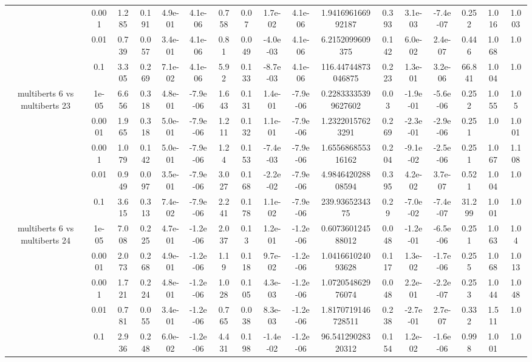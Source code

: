 \begin{tabular}{|c|c|c|c|c|c|c|c|c|c|c|c|c|c|c|c|c|}
 & 0.001 & 1.285 & 0.191 & 4.9e-01 & 4.1e-06 & 0.758 & 0.07 & 1.7e-02 & 4.1e-06 & 1.941696166992187 & 0.393 & 3.1e-03 & -7.4e-07 & 0.252 & 1.016 & 1.003 \\
 & 0.01 & 0.739 & 0.057 & 3.4e-01 & 4.1e-06 & 0.81 & 0.049 & -4.0e-03 & 4.1e-06 & 6.2152099609375 & 0.142 & 6.0e-02 & 2.4e-07 & 0.446 & 1.068 & 1.0 \\
 & 0.1 & 3.305 & 0.269 & 7.1e-02 & 4.1e-06 & 5.92 & 0.133 & -8.7e-03 & 4.1e-06 & 116.44744873046875 & 0.223 & 1.3e-01 & 3.2e-06 & 66.841 & 1.004 & 1.0 \\
\hline
\multirow{5}{*}{multiberts 6 vs multiberts 23} & 1e-05 & 6.656 & 0.318 & 4.8e-01 & -7.9e-06 & 1.643 & 0.131 & 1.4e-01 & -7.9e-06 & 0.22833335399627602 & 0.03 & -1.9e-01 & -5.6e-06 & 0.252 & 1.055 & 1.05 \\
 & 0.0001 & 1.965 & 0.318 & 5.0e-01 & -7.9e-06 & 1.211 & 0.132 & 1.1e-01 & -7.9e-06 & 1.23220157623291 & 0.269 & -2.3e-01 & -2.9e-06 & 0.251 & 1.0 & 1.001 \\
 & 0.001 & 1.079 & 0.142 & 5.0e-01 & -7.9e-06 & 1.24 & 0.153 & -7.4e-03 & -7.9e-06 & 1.655686855316162 & 0.204 & -9.1e-02 & -2.5e-06 & 0.251 & 1.067 & 1.108 \\
 & 0.01 & 0.949 & 0.097 & 3.5e-01 & -7.9e-06 & 3.027 & 0.168 & -2.2e-02 & -7.9e-06 & 4.984642028808594 & 0.395 & 4.2e-02 & 3.7e-07 & 0.521 & 1.004 & 1.0 \\
 & 0.1 & 3.615 & 0.313 & 7.4e-02 & -7.9e-06 & 2.241 & 0.178 & 1.1e-02 & -7.9e-06 & 239.9365234375 & 0.29 & -7.0e-02 & -7.4e-07 & 31.299 & 1.001 & 1.0 \\
\hline
\multirow{5}{*}{multiberts 6 vs multiberts 24} & 1e-05 & 7.008 & 0.225 & 4.7e-01 & -1.2e-06 & 2.037 & 0.13 & 1.2e-01 & -1.2e-06 & 0.607360124588012 & 0.048 & -1.2e-01 & -6.5e-06 & 0.251 & 1.063 & 1.04 \\
 & 0.0001 & 2.073 & 0.268 & 4.9e-01 & -1.2e-06 & 1.19 & 0.118 & 9.7e-02 & -1.2e-06 & 1.041661024093628 & 0.117 & 1.3e-02 & -1.7e-06 & 0.255 & 1.068 & 1.013 \\
 & 0.001 & 1.721 & 0.224 & 4.8e-01 & -1.2e-06 & 1.028 & 0.105 & 4.3e-03 & -1.2e-06 & 1.072054862976074 & 0.048 & 2.2e-01 & -2.2e-07 & 0.253 & 1.044 & 1.048 \\
 & 0.01 & 0.781 & 0.055 & 3.4e-01 & -1.2e-06 & 0.765 & 0.038 & 8.3e-03 & -1.2e-06 & 1.8170719146728511 & 0.238 & -2.7e-01 & 2.7e-07 & 0.332 & 1.511 & 1.0 \\
 & 0.1 & 2.936 & 0.248 & 6.0e-02 & -1.2e-06 & 4.431 & 0.198 & -1.4e-02 & -1.2e-06 & 96.54129028320312 & 0.154 & 1.2e-02 & -1.6e-06 & 0.998 & 1.001 & 1.0 \\

\end{tabular}
